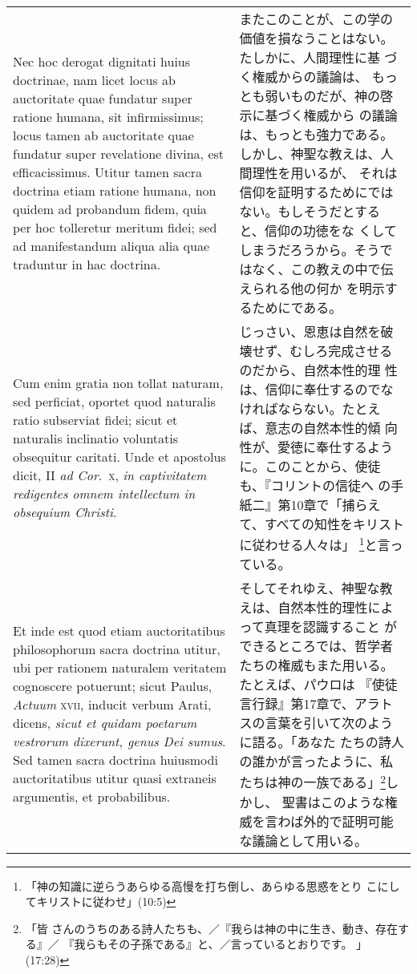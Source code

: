 \documentclass[10pt]{jsarticle}
\begin{document}
\begin{longtable}{p{21em}p{21em}}
\\

Nec hoc derogat dignitati huius doctrinae, nam licet locus ab
auctoritate quae fundatur super ratione humana, sit infirmissimus;
locus tamen ab auctoritate quae fundatur super revelatione divina, est
efficacissimus. Utitur tamen sacra doctrina etiam ratione humana, non
quidem ad probandum fidem, quia per hoc tolleretur meritum fidei; sed
ad manifestandum aliqua alia quae traduntur in hac doctrina.


&


またこのことが、この学の価値を損なうことはない。たしかに、人間理性に基
づく権威からの議論は、 もっとも弱いものだが、神の啓示に基づく権威から
の議論は、もっとも強力である。しかし、神聖な教えは、人間理性を用いるが、
それは信仰を証明するためにではない。もしそうだとすると、信仰の功徳をな
くしてしまうだろうから。そうではなく、この教えの中で伝えられる他の何か
を明示するためにである。



\\

Cum enim gratia non tollat naturam, sed perficiat, oportet quod
naturalis ratio subserviat fidei; sicut et naturalis inclinatio
voluntatis obsequitur caritati. Unde et apostolus dicit, II {\itshape
ad Cor}.~{\scshape x}, {\itshape in captivitatem redigentes omnem
intellectum in obsequium Christi}.


&

じっさい、恩恵は自然を破壊せず、むしろ完成させるのだから、自然本性的理
性は、信仰に奉仕するのでなければならない。たとえば、意志の自然本性的傾
向性が、愛徳に奉仕するように。このことから、使徒も、『コリントの信徒へ
の手紙二』第10章で「捕らえて、すべての知性をキリストに従わせる人々は」
\footnote{「神の知識に逆らうあらゆる高慢を打ち倒し、あらゆる思惑をとり
こにしてキリストに従わせ」(10:5)}と言っている。


\\

Et inde est quod etiam auctoritatibus philosophorum sacra doctrina
utitur, ubi per rationem naturalem veritatem cognoscere potuerunt;
sicut Paulus, {\itshape Actuum} {\scshape xvii}, inducit verbum Arati,
dicens, {\itshape sicut et quidam poetarum vestrorum dixerunt, genus
Dei sumus}. Sed tamen sacra doctrina huiusmodi auctoritatibus utitur
quasi extraneis argumentis, et probabilibus.


&

そしてそれゆえ、神聖な教えは、自然本性的理性によって真理を認識すること
ができるところでは、哲学者たちの権威もまた用いる。たとえば、パウロは
『使徒言行録』第17章で、アラトスの言葉を引いて次のように語る。「あなた
たちの詩人の誰かが言ったように、私たちは神の一族である」\footnote{「皆
さんのうちのある詩人たちも、／『我らは神の中に生き、動き、存在する』／
『我らもその子孫である』と、／言っているとおりです。 」(17:28)}しかし、
聖書はこのような権威を言わば外的で証明可能な議論として用いる。



\end{longtable}
\end{document}
